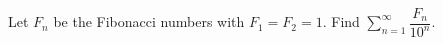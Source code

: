 Let $F_n$ be the Fibonacci numbers with $F_1=F_2=1$. Find $\displaystyle\sum_{n=1}^{\infty}\dfrac{F_n}{10^n}$.
